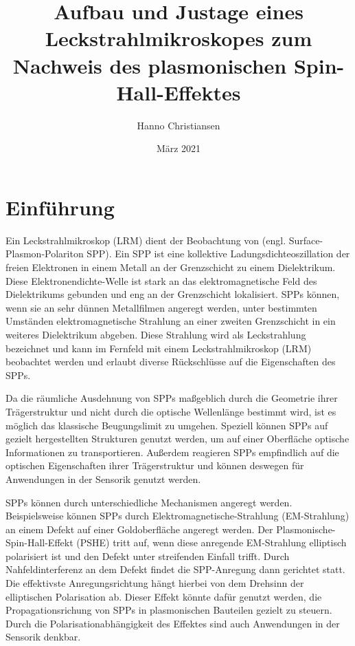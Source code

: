 \documentclass[titlepage]{article}
\title{Aufbau und Justage eines Leckstrahlmikroskopes zum Nachweis des plasmonischen Spin-Hall-Effektes}
\author{Hanno Christiansen}
\date{März 2021}
\begin{document}
	
\maketitle
\tableofcontents
\newpage

\section{Einführung}
Ein Leckstrahlmikroskop (LRM) dient der Beobachtung von (engl. Surface-Plasmon-Polariton SPP). Ein SPP ist eine kollektive Ladungsdichteoszillation der freien Elektronen in einem Metall an der Grenzschicht zu einem Dielektrikum. Diese Elektronendichte-Welle ist stark an das elektromagnetische Feld des Dielektrikums gebunden und eng an der Grenzschicht lokalisiert. SPPs können, wenn sie an sehr dünnen Metallfilmen angeregt werden, unter bestimmten Umständen elektromagnetische Strahlung an einer zweiten Grenzschicht in ein weiteres Dielektrikum abgeben. Diese Strahlung wird als Leckstrahlung bezeichnet und kann im Fernfeld mit einem Leckstrahlmikroskop (LRM) beobachtet werden und erlaubt diverse Rückschlüsse auf die Eigenschaften des SPPs.\cite{Drezet.2008}

Da die räumliche Ausdehnung von SPPs maßgeblich durch die Geometrie ihrer Trägerstruktur und nicht durch die optische Wellenlänge bestimmt wird, ist es möglich das klassische Beugungslimit zu umgehen. Speziell können SPPs auf gezielt hergestellten Strukturen genutzt werden, um auf einer Oberfläche optische Informationen zu transportieren. Außerdem reagieren SPPs empfindlich auf die optischen Eigenschaften ihrer Trägerstruktur und können deswegen für Anwendungen in der Sensorik genutzt werden.\cite{Lin.2013}

SPPs können durch unterschiedliche Mechanismen angeregt werden. Beispielsweise können SPPs durch Elektromagnetische-Strahlung (EM-Strahlung) an einem Defekt auf einer Goldoberfläche angeregt werden. Der Plasmonische-Spin-Hall-Effekt (PSHE) tritt auf, wenn diese anregende EM-Strahlung elliptisch polarisiert ist und den Defekt unter streifenden Einfall trifft. Durch Nahfeldinterferenz an dem Defekt findet die SPP-Anregung dann gerichtet statt. Die effektivste Anregungsrichtung hängt hierbei von dem Drehsinn der elliptischen Polarisation ab. Dieser Effekt könnte dafür genutzt werden, die Propagationsrichung von SPPs in plasmonischen Bauteilen gezielt zu steuern. Durch die Polarisationabhängigkeit des Effektes sind auch Anwendungen in der Sensorik denkbar.\cite{RodriguezFortuno.2013}
\end{document}
